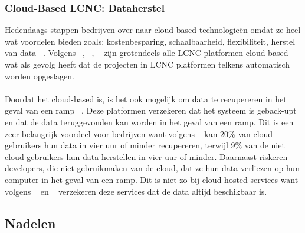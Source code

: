 \subsubsection{Cloud-Based LCNC: Dataherstel}
\label{subsec:cloud-based-lcnc}
Hedendaags stappen bedrijven over naar cloud-based technologieën omdat ze heel wat voordelen bieden zoals: 
kostenbesparing, schaalbaarheid, flexibiliteit, herstel van data ~\autocite{Sufi_2023}. 
Volgens ~\textcites{Sufi_2023}, ~\textcite{Talesra_2021}, ~\textcite{Hintsch2021} zijn grotendeels alle LCNC platformen cloud-based wat als gevolg heeft dat de projecten in LCNC platformen telkens automatisch worden opgeslagen.
\\
\\
Doordat het cloud-based is, is het ook mogelijk om data te recupereren in het geval van een ramp ~\autocite{Sufi_2023}. 
Deze platformen verzekeren dat het systeem is geback-upt en dat de data teruggevonden kan worden in het geval van een ramp. 
Dit is een zeer belangrijk voordeel voor bedrijven want volgens ~\textcite{Sufi_2023} kan 20\% van cloud gebruikers hun data in vier uur of minder recupereren, 
terwijl 9\% van de niet cloud gebruikers hun data herstellen in vier uur of minder. Daarnaast riskeren developers, die niet gebruikmaken van de cloud, 
dat ze hun data verliezen op hun computer in het geval van een ramp. 
Dit is niet zo bij cloud-hosted services want volgens ~\textcite{Sufi_2023} en ~\textcite{Chou_2015} verzekeren deze services dat de data altijd beschikbaar is.
\subsection{Nadelen}%
\label{subsec:nadelen}
